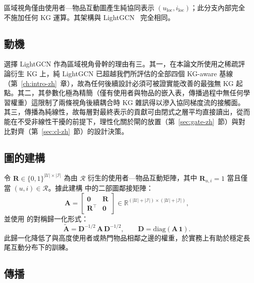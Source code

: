 區域視角僅由使用者—物品互動圖產生純協同表示 $(u_{\mathrm{loc}}, i_{\mathrm{loc}})$；此分支內部完全不施加任何 KG 運算。其架構與 LightGCN~\cite{he2020lightgcn} 完全相同。

\subsection{動機}
\label{sec:local-motivation-zh}

選擇 LightGCN 作為區域視角骨幹的理由有三。其一，在本論文所使用之稀疏評論衍生 KG 上，純 LightGCN 已超越我們所評估的全部四個 KG-aware 基線（第~\ref{ch:intro-zh}~章），故為任何後續設計必須可被證實能改善的最強無 KG 起點。其二，其參數化極為精簡（僅有使用者與物品的嵌入表，傳播過程中無任何學習權重）這限制了兩條視角後續耦合時 KG 雜訊得以滲入協同梯度流的接觸面。其三，傳播為純線性，故每層對最終表示的貢獻可由閉式之層平均直接讀出，從而能在不受非線性干擾的前提下，理性化關於閘的放置（第~\ref{sec:gate-zh}~節）與對比對齊（第~\ref{sec:cl-zh}~節）的設計決策。

\subsection{圖的建構}
\label{sec:local-graph-zh}

令 $\mathbf{R} \in \{0,1\}^{|\mathcal{U}| \times |\mathcal{I}|}$ 為由 $\mathcal{R}$ 衍生的使用者—物品互動矩陣，其中 $\mathbf{R}_{u,i} = 1$ 當且僅當 $(u,i) \in \mathcal{R}$。據此建構  中的二部圖鄰接矩陣：
\begin{equation}
\label{eq:bipartite-A-zh}
\mathbf{A} = \begin{bmatrix} \mathbf{0} & \mathbf{R} \\ \mathbf{R}^{\top} & \mathbf{0} \end{bmatrix} \in \mathbb{R}^{(|\mathcal{U}| + |\mathcal{I}|) \times (|\mathcal{U}| + |\mathcal{I}|)},
\end{equation}
並使用  的對稱歸一化形式：
\begin{equation}
\label{eq:normalized-A-zh}
\tilde{\mathbf{A}} = \mathbf{D}^{-1/2}\, \mathbf{A}\, \mathbf{D}^{-1/2}, \qquad \mathbf{D} = \mathrm{diag}\!\left(\mathbf{A}\,\mathbf{1}\right).
\end{equation}
此歸一化降低了與高度使用者或熱門物品相鄰之邊的權重，於實務上有助於穩定長尾互動分布下的訓練。

\subsection{傳播}
\label{sec:local-prop-zh}

